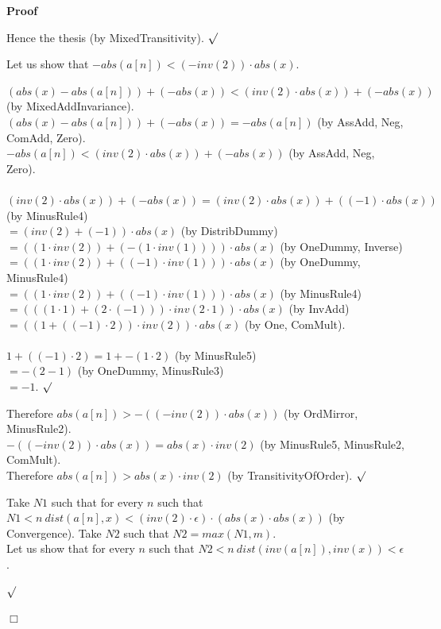 \documentclass{article}
\newenvironment{forthel}{\begin{leftbar}}{\end{leftbar}}
\newenvironment{proof}{\noindent\textbf{Proof\ }}{\hspace*{\fill}$\Box$\medskip}
\newenvironment{subproof}{\begin{list}{}{}
		\item[\text{Proof}]}{\hfill $\surd$ \end{list}}
\newcommand{\dotequal}{=}
\begin{document}
\begin{forthel}
\begin{proof}
\begin{subproof}
\begin{subproof}
	Hence the thesis (by MixedTransitivity).
	\end{subproof}
	Let us show that $-abs(a[n]) < (-inv(2)) \cdot abs(x)$.
	\begin{subproof}
	$(abs(x) - abs(a[n])) + (-abs(x)) < (inv(2) \cdot abs(x)) + (-abs(x))$ (by MixedAddInvariance). 
	\\$(abs(x) - abs(a[n])) + (-abs(x)) = -abs(a[n])$ (by AssAdd, Neg, ComAdd, Zero).
	\\$-abs(a[n]) < (inv(2) \cdot abs(x)) + (-abs(x))$ (by AssAdd, Neg, Zero).
	\\\\$(inv(2) \cdot abs(x)) + (-abs(x)) \dotequal (inv(2) \cdot abs(x)) + ((-1) \cdot abs(x))$ (by MinusRule4)
	\\$\dotequal (inv(2) + (-1)) \cdot abs(x)$ (by DistribDummy)
	\\$\dotequal ((1 \cdot inv(2)) + (-(1 \cdot inv(1)))) \cdot abs(x)$ (by OneDummy, Inverse)
	\\$\dotequal ((1 \cdot inv(2)) + ((-1) \cdot inv(1))) \cdot abs(x)$ (by OneDummy, MinusRule4)
	\\$\dotequal ((1 \cdot inv(2)) + ((-1) \cdot inv(1))) \cdot abs(x)$ (by MinusRule4)
	\\$\dotequal (((1 \cdot 1) + (2 \cdot (-1))) \cdot inv(2 \cdot 1)) \cdot abs(x)$ (by InvAdd)
	\\$\dotequal ((1 + ((-1) \cdot 2)) \cdot inv(2)) \cdot abs(x)$ (by One, ComMult).
	\\\\$1 + ((-1) \cdot 2) \dotequal 1 + -(1 \cdot 2)$ (by MinusRule5)
	\\$\dotequal -(2 - 1)$ (by OneDummy, MinusRule3)
	\\$\dotequal -1$. 
	\end{subproof}
    Therefore $abs(a[n]) > -((-inv(2)) \cdot abs(x))$ (by OrdMirror, MinusRule2).
    \\$-((-inv(2)) \cdot abs(x)) = abs(x) \cdot inv(2)$ (by MinusRule5, MinusRule2, ComMult).
    \\Therefore $abs(a[n]) > abs(x) \cdot inv(2)$ (by TransitivityOfOrder).
	\end{subproof}
	Take $N1$ such that for every $n$ such that $N1 < n \ dist(a[n],x) < (inv(2) \cdot \epsilon) \cdot (abs(x) \cdot abs(x))$ (by Convergence). 
	Take $N2$ such that $N2 = max(N1,m)$.
	\\Let us show that for every $n$ such that $N2 < n \ dist(inv(a[n]),inv(x)) < \epsilon$.
	\begin{subproof}

\end{subproof}
\end{proof}
\end{forthel}
\end{document}
